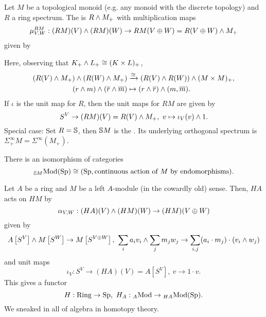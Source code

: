 \begin{example}
Let $M$ be a topological monoid (e.g. any monoid with the discrete topology) and $R$ a ring spectrum. The  is $R\wedge M_+$ with multiplication maps
\[\mu_{V,W}^{RM}:(RM)(V)\wedge(RM)(W)\to RM(V\oplus W) = R(V\oplus W)\wedge M_+ \]
given by
\begin{center}
\small
{}
\end{center}
Here, observing that $K_+ \wedge L_+ \cong (K \times L)_+$,
\begin{align*}
(R(V) \wedge M_+) \wedge (R(W) \wedge M_+) &\xrightarrow{\cong} (R(V) \wedge R(W)) \wedge (M \times M)_+,\\
(r \wedge m) \wedge (\overline{r} \wedge \overline{m}) &\mapsto (r \wedge \overline{r}) \wedge (m, \overline{m}).
\end{align*}
\noindent If $\iota$ is the unit map for $R$, then the unit maps for $RM$ are given by
\[ S^V \to (RM)(V) = R(V) \wedge M_+, \ v \mapsto \iota_V(v) \wedge 1. \]
Special case: Set $R = \mathbb{S}$, then $\mathbb{S} M$ is the . Its underlying orthogonal spectrum is $\Sigma_+^{\infty}M = \Sigma^{\infty}(M_+)$.
\end{example}

\begin{exercise}
There is an isomorphism of categories
\[{}_{\mathbb{S} M\!}\operatorname{Mod}({\normalfont\textup{Sp}})\cong({\normalfont\textup{Sp}},\text{continuous action of $M$ by endomorphisms}).\]
\end{exercise}

\begin{example}
Let $A$ be a ring and $M$ be a left $A$-module (in the cowardly old) sense. Then, $HA$ acts on $HM$ by
\[\alpha_{V,W}:(HA)(V)\wedge(HM)(W)\to(HM)(V\oplus W)\]
given by
\[A\left[S^V\right] \wedge M\left[S^W\right] \to M\left[S^{V \oplus W}\right],\ \sum_i a_i v_i\wedge\sum_j m_j w_j\to\sum_{i,j}(a_i\cdot m_j)\cdot(v_i\wedge w_j)\]
and unit maps
\[\iota_V:S^V\to(HA)(V)=A\left[S^V\right],\ v\to1\cdot v.\]
This gives a functor
\[H:\Ring\to\Sp,\ H_A:{}_{A\!}\Mod\to{}_{HA\!}\Mod(\Sp).\]
We sneaked in all of algebra in homotopy theory.
\end{example}
